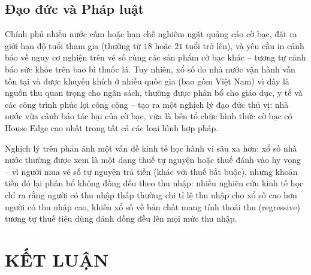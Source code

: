 \documentclass[12pt,a4paper]{article}
\theoremstyle{coloredthm}
\theoremstyle{coloreddef}
\theoremstyle{remark}
\begin{document}
\subsection{Đạo đức và Pháp luật}

Chính phủ nhiều nước cấm hoặc hạn chế nghiêm ngặt quảng cáo cờ bạc, đặt ra giới hạn độ tuổi tham gia (thường từ $18$ hoặc $21$ tuổi trở lên), và yêu cầu in cảnh báo về nguy cơ nghiện trên vé số cùng các sản phẩm cờ bạc khác -- tương tự cảnh báo sức khỏe trên bao bì thuốc lá. Tuy nhiên, xổ số do nhà nước vận hành vẫn tồn tại và được khuyến khích ở nhiều quốc gia (bao gồm Việt Nam) vì đây là nguồn thu quan trọng cho ngân sách, thường được phân bổ cho giáo dục, y tế và các công trình phúc lợi công cộng -- tạo ra một nghịch lý đạo đức thú vị: nhà nước vừa cảnh báo tác hại của cờ bạc, vừa là bên tổ chức hình thức cờ bạc có House Edge cao nhất trong tất cả các loại hình hợp pháp.

\begin{giaithich}
Nghịch lý trên phản ánh một vấn đề kinh tế học hành vi sâu xa hơn: xổ số nhà nước thường được xem là một dạng thuế tự nguyện hoặc thuế đánh vào hy vọng -- vì người mua vé số tự nguyện trả tiền (khác với thuế bắt buộc), nhưng khoản tiền đó lại phân bổ không đồng đều theo thu nhập: nhiều nghiên cứu kinh tế học chỉ ra rằng người có thu nhập thấp thường chi tỉ lệ thu nhập cho xổ số cao hơn người có thu nhập cao, khiến xổ số về bản chất mang tính thoái thu (regressive) tương tự thuế tiêu dùng đánh đồng đều lên mọi mức thu nhập.
\end{giaithich}

\newpage
\section*{KẾT LUẬN}
\end{document}
